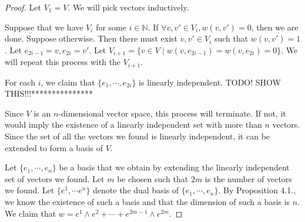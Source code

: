 \documentclass[12pt, psamsfonts]{amsart}
\theoremstyle{definition}
\theoremstyle{remark}
\numberwithin{equation}{section}
\begin{document}
\begin{proof}
  Let $V_1 = V$.
  We will pick vectors inductively.

  Suppose that we have $V_i$ for some $i \in \mathbb{N}$.
  If $\forall v, v' \in V_i, w(v, v')  = 0$, then we are done.
  Suppose otherwise.
  Then there must exist $v, v' \in V_i$ such that $w(v, v') = 1$.
  Let $e_{2i - 1} = v, e_{2i} = v'$.
  Let $V_{i + 1} = \{ v \in V \mid w(v, e_{2i - 1}) = w(v, e_{2i}) = 0 \}$.
  We will repeat this process with the $V_{i + 1}$.

  For each $i$, we claim that $\{ e_1, \cdots, e_{2i} \}$ is linearly independent.
  TODO! SHOW THIS!!!***************

  Since $V$ is an $n$-dimensional vector space, this process will terminate.
  If not, it would imply the existence of a linearly independent set with more than $n$ vectors.
  Since the set of all the vectors we found is linearly independent, it can be extended to form a basis of $V$.

  Let $\{ e_1, \cdots, e_n \}$ be a basis that we obtain by extending the linearly independent set of vectors we found.
  Let $m$ be chosen such that $2m$ is the number of vectors we found.
  Let $\{ e^1, \cdots e^n \}$ denote the dual basis of $\{ e_1, \cdots, e_n \}$.
  By Proposition 4.1., we know the existence of such a basis and that the dimension of such a basis is $n$.
  We claim that $w = e^1 \wedge e^2 + \cdots + e^{2m - 1} \wedge e^{2m}$.


\end{proof}
\end{document}

